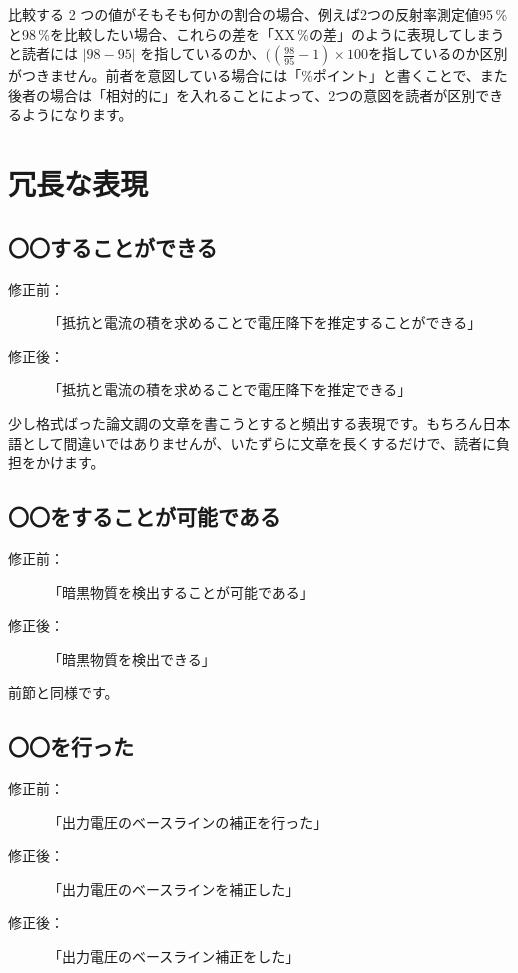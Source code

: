 比較する 2 つの値がそもそも何かの割合の場合、例えば2つの反射率測定値95\,\%と98\,\%を比較したい場合、これらの差を「XX\,\%の差」のように表現してしまうと読者には $|98-95|$ を指しているのか、$((\frac{98}{95} - 1)\times100$を指しているのか区別がつきません。前者を意図している場合には「\%ポイント」と書くことで、また後者の場合は「相対的に」を入れることによって、2つの意図を読者が区別できるようになります。


\section{冗長な表現}

\subsection{〇〇することができる}

\begin{description}
\item[修正前：]「抵抗と電流の積を求めることで電圧降下を推定することができる」
\item[修正後：]「抵抗と電流の積を求めることで電圧降下を推定できる」
\end{description}

少し格式ばった論文調の文章を書こうとすると頻出する表現です。もちろん日本語として間違いではありませんが、いたずらに文章を長くするだけで、読者に負担をかけます。

\subsection{〇〇をすることが可能である}

\begin{description}
\item[修正前：]「暗黒物質を検出することが可能である」
\item[修正後：]「暗黒物質を検出できる」
\end{description}

前節と同様です。

\subsection{〇〇を行った}

\begin{description}
\item[修正前：]「出力電圧のベースラインの補正を行った」
\item[修正後：]「出力電圧のベースラインを補正した」
\item[修正後：]「出力電圧のベースライン補正をした」
\end{description}

